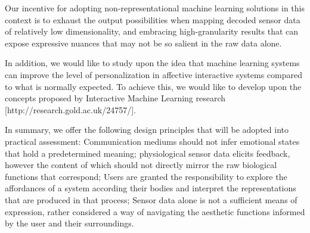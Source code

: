 Our incentive for adopting non-representational machine learning solutions in this context is to exhaust the output possibilities when mapping decoded sensor data of relatively low dimensionality, and embracing high-granularity results that can expose expressive nuances that may not be so salient in the raw data alone.

In addition, we would like to study upon the idea that machine learning systems can improve the level of personalization in affective interactive systems compared to what is normally expected. To achieve this, we would like to develop upon the concepts proposed by Interactive Machine Learning research [http://research.gold.ac.uk/24757/].




In summary, we offer the following design principles that will be adopted into practical assessment: Communication mediums should not infer emotional states that hold a predetermined meaning; physiological sensor data elicits feedback, however the content of which should not directly mirror the raw biological functions that correspond; Users are granted the responsibility to explore the affordances of a system according their bodies and interpret the representations that are produced in that process; Sensor data alone is not a sufficient means of expression, rather considered a way of navigating the aesthetic functions informed by the user and their surroundings.

